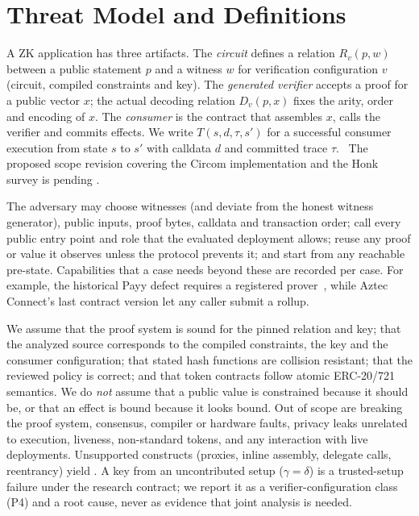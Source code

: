 \section{Threat Model and Definitions}\label{sec:threat}

A ZK application has three artifacts. The \emph{circuit} defines a relation
$R_v(p,w)$ between a public statement $p$ and a witness $w$ for verification
configuration $v$ (circuit, compiled constraints and key). The
\emph{generated verifier} accepts a proof for a public vector $x$; the actual
decoding relation $D_v(p,x)$ fixes the arity, order and encoding of $x$. The
\emph{consumer} is the contract that assembles $x$, calls the verifier and
commits effects. We write $T(s,d,\tau,s')$ for a successful consumer
execution from state $s$ to $s'$ with calldata $d$ and committed trace
$\tau$.%
\
The proposed scope revision covering the Circom implementation and the Honk survey is pending .

The adversary may choose witnesses (and deviate from the honest witness
generator), public inputs, proof bytes, calldata and transaction order; call
every public entry point and role that the evaluated deployment allows; reuse
any proof or value it observes unless the protocol prevents it; and start from
any reachable pre-state. Capabilities that a case needs beyond these are
recorded per case. For example, the historical Payy defect requires a
registered prover~\cite{payy-ghsa}, while Aztec Connect's last contract
version let any caller submit a rollup.%

We assume that the proof system is sound for the pinned relation and key;
that the analyzed source corresponds to the compiled constraints, the key and
the consumer configuration; that stated hash functions are collision
resistant; that the reviewed policy is correct; and that token contracts
follow atomic ERC-20/721 semantics. We do \emph{not} assume that a public
value is constrained because it should be, or that an effect is bound because
it looks bound. Out of scope are breaking the proof system, consensus,
compiler or hardware faults, privacy leaks unrelated to execution, liveness,
non-standard tokens, and any interaction with live deployments. Unsupported
constructs (proxies, inline assembly, delegate calls, reentrancy) yield \UNK{}.
A key from an uncontributed setup ($\gamma=\delta$) is a trusted-setup failure
under the research contract; we report it as a verifier-configuration class
(P4) and a root cause, never as evidence that joint analysis is needed.%

